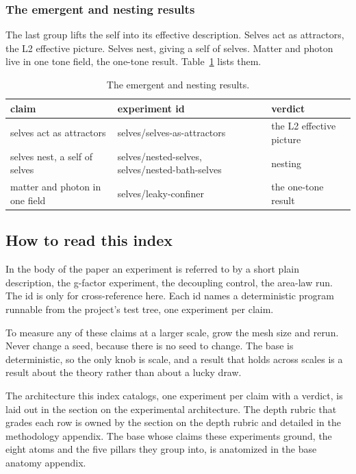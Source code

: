 \subsubsection{The emergent and nesting results}

The last group lifts the self into its effective description. Selves act as attractors, the L2 effective picture. Selves nest, giving a self of selves. Matter and photon live in one tone field, the one-tone result. Table~\ref{tab:nesting} lists them.

\begin{table}[ht]
\centering
\begin{tabular}{@{}p{}p{}p{}@{}}
\toprule
claim & experiment id & verdict \\
\midrule
selves act as attractors & selves/selves-as-attractors & the L2 effective picture \\
selves nest, a self of selves & selves/nested-selves, selves/nested-bath-selves & nesting \\
matter and photon in one field & selves/leaky-confiner & the one-tone result \\
\bottomrule
\end{tabular}
\caption{The emergent and nesting results.}
\label{tab:nesting}
\end{table}

\subsection{How to read this index}

In the body of the paper an experiment is referred to by a short plain description, the g-factor experiment, the decoupling control, the area-law run. The id is only for cross-reference here. Each id names a deterministic program runnable from the project's test tree, one experiment per claim.

\begin{result}
To measure any of these claims at a larger scale, grow the mesh size and rerun. Never change a seed, because there is no seed to change. The base is deterministic, so the only knob is scale, and a result that holds across scales is a result about the theory rather than about a lucky draw.
\end{result}

The architecture this index catalogs, one experiment per claim with a verdict, is laid out in the section on the experimental architecture. The depth rubric that grades each row is owned by the section on the depth rubric and detailed in the methodology appendix. The base whose claims these experiments ground, the eight atoms and the five pillars they group into, is anatomized in the base anatomy appendix.
